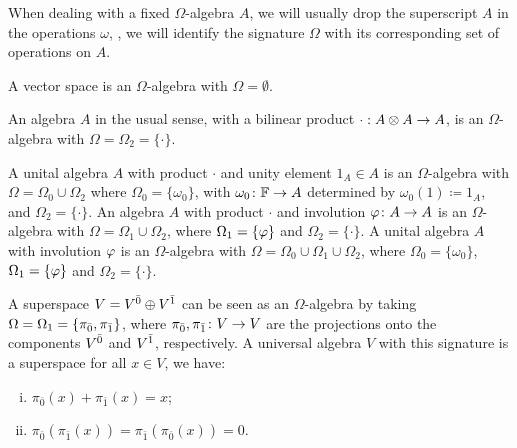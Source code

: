 \begin{notation}
    When dealing with a fixed $\Omega$-algebra $A$, we will usually drop the superscript $A$ in the operations $\omega$, \ie, we will identify the signature $\Omega$ with its corresponding set of operations on $A$. 
\end{notation}

\begin{ex}\label{ex:omega-vec-space}
	A vector space is an $\Omega$-algebra with $\Omega = \emptyset$.
\end{ex}

\newcommand{\multiplication}{\cdot}

\begin{ex}\label{ex:omega-algebra}
	An algebra $A$ in the usual sense, with a bilinear product $\multiplication : A\tensor A \to A$, is an $\Omega$-algebra with $\Omega = \Omega_2 = \{ \multiplication \}$. 
\end{ex}

\begin{ex}\label{ex:Omega-unity-inv}
    A unital algebra $A$ with product $\multiplication$ and unity element $1_A \in A$ is an $\Omega$-algebra with $\Omega = \Omega_0 \cup \Omega_2$ where $\Omega_0 = \{ \omega_0 \}$, with $\omega_0\colon \mathbb{F} \to A$ determined by $\omega_0 (1) \coloneqq 1_A$, and $\Omega_2 = \{ \multiplication \}$. 
    An algebra $A$ with product $\multiplication$ and involution $\varphi\colon A \to A$ is an $\Omega$-algebra with $\Omega = \Omega_1 \cup \Omega_2$, where $\Omega_1 = \{ \varphi \}$ and $\Omega_2 = \{ \multiplication \}$. 
    A unital algebra $A$ with involution $\varphi$ is an $\Omega$-algebra with $\Omega = \Omega_0 \cup \Omega_1 \cup \Omega_2$, where $\Omega_0 = \{ \omega_0 \}$, $\Omega_1 = \{ \varphi \}$ and $\Omega_2 = \{ \multiplication \}$. 
\end{ex}


\begin{ex}\label{ex:omega-superspace}
	A superspace $V = V^{\bar0} \oplus V^{\bar1}$ can be seen as an $\Omega$-algebra by taking $\Omega = \Omega_1 = \{ \pi_{\bar{0}}, \pi_{\bar{1}} \}$, where $\pi_{\bar{0}}, \pi_{\bar{1}} \colon V \to V$ are the projections onto the components $V^{\bar0}$ and $V^{\bar1}$, respectively. 
	A universal algebra $V$ with this signature is a superspace \IFF for all $x \in V$, we have:
	\begin{enumerate}[(i)]
		\item $\pi_{\bar 0}(x) + \pi_{\bar 1}(x) = x$; \label{item:sum-projections}
		\item $\pi_{\bar 0} ( \pi_{\bar 1} (x) )
		= \pi_{\bar 1} ( \pi_{\bar 0} (x) )
		= 0$. \label{item:orthogonal-projections}
	\end{enumerate}
\end{ex}


